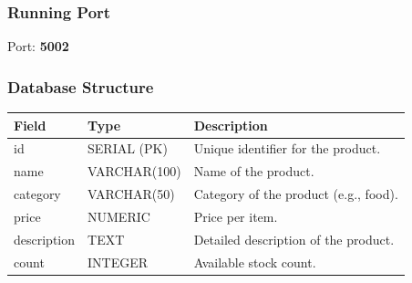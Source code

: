 \documentclass[a4paper,12pt]{article}
\begin{document}
\subsubsection{Running Port}
Port: \textbf{5002}

\subsubsection{Database Structure}
\begin{longtable}{|p{3cm}|p{3cm}|p{8cm}|}
\hline
\textbf{Field} & \textbf{Type} & \textbf{Description} \\
\hline
id & SERIAL (PK) & Unique identifier for the product. \\
\hline
name & VARCHAR(100) & Name of the product. \\
\hline
category & VARCHAR(50) & Category of the product (e.g., food). \\
\hline
price & NUMERIC & Price per item. \\
\hline
description & TEXT & Detailed description of the product. \\
\hline
count & INTEGER & Available stock count. \\
\hline
\end{longtable}
\end{document}
